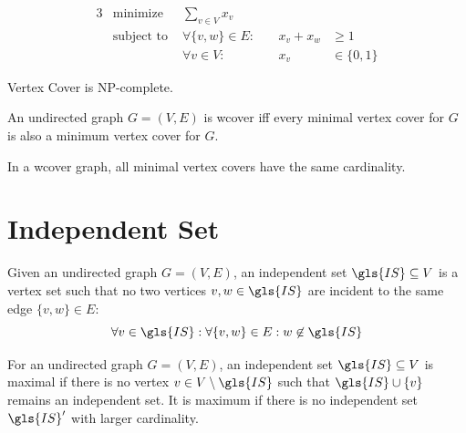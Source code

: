 
\begin{problem}
  \begin{alignat*}{3}
    &\text{minimize } & \sum\limits_{v \in V} x_v \\
    &\text{subject to } & \forall \{v,w\} \in E : &~& x_v + x_w &\geq 1 \\
    && \forall v \in V : &~& x_v &\in \{0,1\}
  \end{alignat*}
\end{problem}


\begin{theorem}
  Vertex Cover is NP-complete. \cite{karp_np_complete}
\end{theorem}


\begin{definition}
  \label{def:well_covered}
  An undirected graph \(G=(V,E)\) is \gls{wcover} iff every minimal
  vertex cover for \(G\) is also a minimum vertex cover for \(G\).
  \cite{graph_well_covered}
\end{definition}


\begin{theorem}
  \label{thm:well_covered_vertex_cover}
  In a \gls{wcover} graph, all minimal vertex covers have the same
  cardinality. \cite{graph_well_covered}
\end{theorem}

\section{Independent Set}


\begin{definition}
  \label{def:independent_set}
  Given an undirected graph \(G=(V,E)\), an independent set
  \(\gls{IS} \subseteq V\) is a vertex set such that no two
  vertices \(v,w \in \gls{IS}\) are incident to the same edge 
  \(\{v,w\} \in E\):
  \[
    \forall v \in \gls{IS}:
    \forall \{v,w\} \in E:
    w \not\in \gls{IS}
  \]
\end{definition}


\begin{definition}
  \label{def:max_independent_set}
  For an undirected graph \(G=(V,E)\), an independent set
  \(\gls{IS}\subseteq V\) is maximal if there is no vertex
  \(v \in V\setminus \gls{IS}\) such that
  \(\gls{IS} \cup \{v\}\) remains an independent set. It is
  maximum if there is no independent set \(\gls{IS}'\) with
  larger cardinality.
\end{definition}

